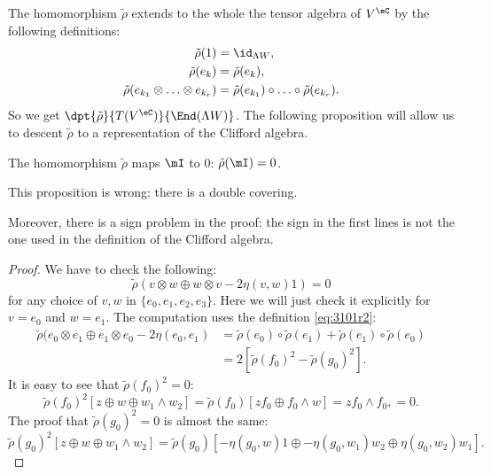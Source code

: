 The homomorphism $\tilde\rho$ extends to the whole the tensor algebra of $V^{\eC}$ by the following definitions:
\begin{subequations}
	\begin{align}
		\tilde\rho(1)                                   & =\id_{\Lambda W}, \\
		\tilde\rho(e_k)                                 & =\tilde\rho(e_k), \\
		\tilde\rho(e_{k_1}\otimes\ldots\otimes e_{k_r}) & =
		\tilde\rho(e_{k_1})\circ\ldots\circ\tilde\rho(e_{k_r}).\label{eq:3101r2}
	\end{align}
\end{subequations}
So we get $\dpt{\tilde\rho}{T(V^{\eC})}{\End(\Lambda W)}$.  The following proposition will allow us to descent $\tilde\rho$ to a representation of the Clifford algebra.

\begin{proposition}
	The homomorphism $\tilde\rho$ maps $\mI$ to $0$: $\tilde\rho(\mI)=0$.
\end{proposition}

\begin{probleme}
	This proposition is wrong: there is a double covering.

	Moreover, there is a sign problem in the proof: the sign in the first lines is not the one used in the definition of the Clifford algebra.
\end{probleme}


\begin{proof}
	We have to check the following:
	\[\tilde\rho(v\otimes w\oplus w\otimes v-2\eta(v,w)1)=0\]
	for any choice of
	$v,w$ in $\{e_0,e_1,e_2,e_3\}$.
	Here we will just check it explicitly for $v=e_0$ and $w=e_1$. The computation uses the definition \eqref{eq:3101r2}:
	\begin{equation}
		\begin{split}
			\tilde\rho(e_0\otimes e_1\oplus e_1\otimes
			e_0-2\eta(e_0,e_1) & =\tilde\rho(e_0)\circ\tilde\rho(e_1)+\tilde\rho(e_1)\circ\tilde\rho(e_0) \\
			                   & =2\left[\tilde\rho(f_0)^2-\tilde\rho(g_0)^2\right].
		\end{split}
	\end{equation}
	It is easy to see that $\tilde\rho(f_0)^2=0$:
	\begin{equation}
		\tilde\rho(f_0)^2\left[z\oplus w\oplus w_1\wedge w_2 \right]=\tilde\rho(f_0)[zf_0\oplus f_0\wedge w]
		=zf_0\wedge f_0,
		=0.
	\end{equation}
	The proof that $\tilde\rho(g_0)^2=0$ is almost the same:
	\[
		\tilde\rho(g_0)^2\left[z\oplus w\oplus w_1\wedge w_2 \right]
		=\tilde\rho(g_0)[-\eta(g_0,w)1\oplus-\eta(g_0,w_1)w_2\oplus\eta(g_0,w_2)w_1].
	\]

\end{proof}

